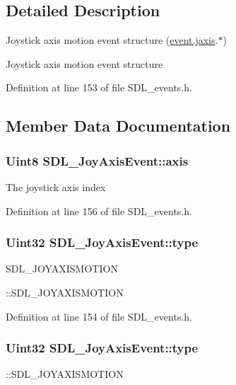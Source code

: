 \subsection{Detailed Description}
Joystick axis motion event structure (\hyperlink{unionSDL__Event_ac4611acd0e9c675e67dc20919f0accb4}{event.\+jaxis}.$\ast$) 

Joystick axis motion event structure 

Definition at line 153 of file S\+D\+L\+\_\+events.\+h.



\subsection{Member Data Documentation}
\hypertarget{structSDL__JoyAxisEvent_a0beac2fb161e45771c424bd0b6daeabb}{
\subsubsection[{axis}]{\setlength{\rightskip}{0pt plus 5cm}Uint8 S\+D\+L\+\_\+\+Joy\+Axis\+Event\+::axis}}\label{structSDL__JoyAxisEvent_a0beac2fb161e45771c424bd0b6daeabb}
The joystick axis index 

Definition at line 156 of file S\+D\+L\+\_\+events.\+h.

\hypertarget{structSDL__JoyAxisEvent_aed1c873fb90ba58194e65f972933c67d}{
\subsubsection[{type}]{\setlength{\rightskip}{0pt plus 5cm}Uint32 S\+D\+L\+\_\+\+Joy\+Axis\+Event\+::type}}\label{structSDL__JoyAxisEvent_aed1c873fb90ba58194e65f972933c67d}
S\+D\+L\+\_\+\+J\+O\+Y\+A\+X\+I\+S\+M\+O\+T\+I\+O\+N

\+::\+S\+D\+L\+\_\+\+J\+O\+Y\+A\+X\+I\+S\+M\+O\+T\+I\+O\+N 

Definition at line 154 of file S\+D\+L\+\_\+events.\+h.

\hypertarget{structSDL__JoyAxisEvent_aed1c873fb90ba58194e65f972933c67d}{
\subsubsection[{type}]{\setlength{\rightskip}{0pt plus 5cm}Uint32 S\+D\+L\+\_\+\+Joy\+Axis\+Event\+::type}}\label{structSDL__JoyAxisEvent_aed1c873fb90ba58194e65f972933c67d}
\+::\+S\+D\+L\+\_\+\+J\+O\+Y\+A\+X\+I\+S\+M\+O\+T\+I\+O\+N 

